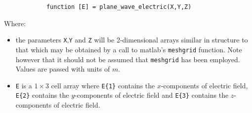 \documentclass[a4paper, 12pt]{article}
\begin{document}
\begin{itemize}
		\begin{verbatim}
			function [E] = plane_wave_electric(X,Y,Z)
		\end{verbatim}

		Where:
		\begin{itemize}
			\item the parameters \verb+X+,\verb+Y+ and \verb+Z+ will be
			2-dimensional arrays similar in structure to that which  may be
			obtained by a call to matlab's \verb+meshgrid+ function. Note
			however that it should not be assumed that \verb+meshgrid+ has been
			employed. Values are passed with units of $ m$.
			\item \verb+E+ is a $1\times3$ cell array where \verb+E{1}+ contains
			the $x$-components of electric field, \verb+E{2}+ contains
			the $y$-components of electric field and \verb+E{3}+ contains
			the $z$-components of electric field.


\end{itemize}
\end{itemize}
\end{document}
